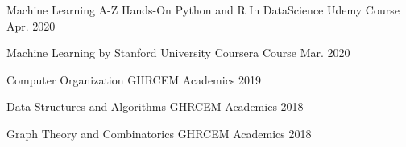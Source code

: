 

\begin{cvhonors}

  \cvhonor
    {Machine Learning A-Z}
    {Hands-On Python and R In DataScience} %
    {Udemy Course} %
    {Apr. 2020} %

  \cvhonor
    {Machine Learning} %
    {by Stanford University} %
    {Coursera Course} %
    {Mar. 2020} %
    
\cvhonor
    {Computer Organization} %
    {GHRCEM} %
    {Academics} %
    {2019} %

\cvhonor
    {Data Structures and Algorithms} %
    {GHRCEM} %
    {Academics} %
    {2018} %

\cvhonor
    {Graph Theory and Combinatorics} %
    {GHRCEM} %
    {Academics} %
    {2018} %

\end{cvhonors}
